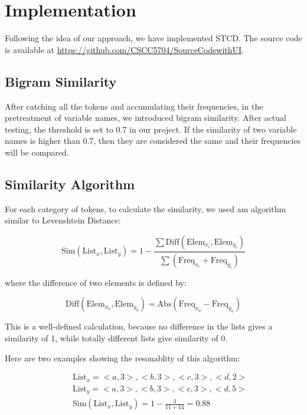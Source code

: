 \documentclass[../main.tex]{subfiles}
\begin{document}
\section{Implementation}

Following the idea of our approach, we have implemented STCD. The source code is available at {\color{blue} \url{https://github.com/CSCC5704/SourceCodewithUI}}.

\subsection{Bigram Similarity}

After catching all the tokens and accumulating their frequencies, in the pretreatment of variable names, we introduced bigram similarity. After actual testing, the threshold is set to 0.7 in our project. If the similarity of two variable names is higher than 0.7, then they are considered the same and their frequencies will be compared.

\subsection{Similarity Algorithm}

For each category of tokens, to calculate the similarity, we used am algorithm similar to Levenshtein Distance:

\begin{equation}
\text{Sim}(\text{List}_x, \text{List}_y) = 1 - \frac{\sum \text{Diff}(\text{Elem}_{x_i}, \text{Elem}_{y_i})} {\sum (\text{Freq}_{x_i} + \text{Freq}_{y_i} )}
\end{equation}

where the difference of two elements is defined by:

\begin{equation}
\text{Diff}(\text{Elem}_{x_a}, \text{Elem}_{y_a}) = \text{Abs}(\text{Freq}_{x_a} - \text{Freq}_{y_a})
\end{equation}

This is a well-defined calculation, because no difference in the lists gives a similarity of 1, while totally different lists give similarity of 0.

Here are two examples showing the resonablity of this algorithm:

\begin{eqnarray}\nonumber
&&\text{List}_x = {<a, 3>, <b, 3>, <c, 3>, <d, 2>}\\ \nonumber
&&\text{List}_y = {<a, 3>, <b, 3>, <c, 3>, <d, 5>} \\ 
&&\text{Sim}(\text{List}_x, \text{List}_y) = 1 - \frac{3}{11 + 14} = 0.88
\end{eqnarray}
\end{document}

